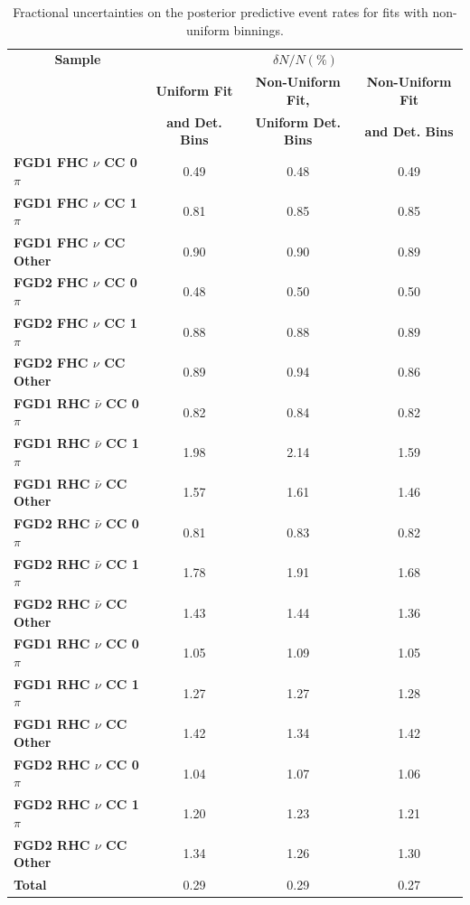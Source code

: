 \begin{center}
\begin{table}
\center
\begin{tabular}{l||c c c}
\hline \hline
\multicolumn{1}{c||}{\textbf{Sample}} & \multicolumn{3}{c}{$\delta N/N(\%)$}\\
& \multicolumn{1}{c}{\textbf{Uniform Fit}} & \multicolumn{1}{c}{\textbf{Non-Uniform Fit,}} & \multicolumn{1}{c}{\textbf{Non-Uniform Fit}}\\
& \multicolumn{1}{c}{\textbf{and Det. Bins}} & \multicolumn{1}{c}{\textbf{Uniform Det. Bins}} & \multicolumn{1}{c}{\textbf{and Det. Bins}}\\
\hline
\hline
\textbf{FGD1 FHC $\nu$ CC 0$\pi$} & 0.49 & 0.48 & 0.49\\
\textbf{FGD1 FHC $\nu$ CC 1$\pi$} & 0.81 & 0.85 & 0.85\\ 
\textbf{FGD1 FHC $\nu$ CC Other} & 0.90 & 0.90 & 0.89\\ \hline
\textbf{FGD2 FHC $\nu$ CC 0$\pi$} & 0.48 & 0.50 & 0.50\\
\textbf{FGD2 FHC $\nu$ CC 1$\pi$} & 0.88 & 0.88 & 0.89\\
\textbf{FGD2 FHC $\nu$ CC Other} & 0.89 & 0.94 & 0.86\\ \hline
\textbf{FGD1 RHC $\bar{\nu}$ CC 0$\pi$} & 0.82 & 0.84 & 0.82\\
\textbf{FGD1 RHC $\bar{\nu}$ CC 1$\pi$} & 1.98 & 2.14 & 1.59\\
\textbf{FGD1 RHC $\bar{\nu}$ CC Other} & 1.57 & 1.61 & 1.46\\ \hline
\textbf{FGD2 RHC $\bar{\nu}$ CC 0$\pi$} & 0.81 & 0.83 & 0.82\\
\textbf{FGD2 RHC $\bar{\nu}$ CC 1$\pi$} & 1.78 & 1.91 & 1.68\\
\textbf{FGD2 RHC $\bar{\nu}$ CC Other} & 1.43 & 1.44 & 1.36\\ \hline
\textbf{FGD1 RHC $\nu$ CC 0$\pi$} & 1.05 & 1.09 & 1.05\\
\textbf{FGD1 RHC $\nu$ CC 1$\pi$} & 1.27 & 1.27 & 1.28\\
\textbf{FGD1 RHC $\nu$ CC Other}& 1.42  & 1.34 & 1.42\\ \hline
\textbf{FGD2 RHC $\nu$ CC 0$\pi$} & 1.04 & 1.07 & 1.06\\
\textbf{FGD2 RHC $\nu$ CC 1$\pi$} & 1.20 & 1.23 & 1.21\\ 
\textbf{FGD2 RHC $\nu$ CC Other} & 1.34 & 1.26 & 1.30\\ \hline
\textbf{Total} & 0.29 & 0.29 & 0.27 \\ \hline\hline
\end{tabular}
\caption{Fractional uncertainties on the posterior predictive event rates for fits with non-uniform binnings.}
\label{tab:polyprederr}
\end{table}
\end{center}

